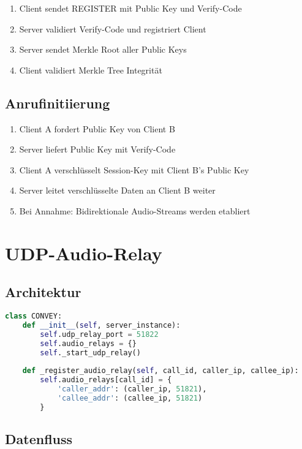 \documentclass[10pt,a4paper]{article}
\begin{document}
\begin{enumerate}
\item Client sendet REGISTER mit Public Key und Verify-Code
\item Server validiert Verify-Code und registriert Client
\item Server sendet Merkle Root aller Public Keys
\item Client validiert Merkle Tree Integrität
\end{enumerate}

\subsection{Anrufinitiierung}

\begin{enumerate}
\item Client A fordert Public Key von Client B
\item Server liefert Public Key mit Verify-Code
\item Client A verschlüsselt Session-Key mit Client B's Public Key
\item Server leitet verschlüsselte Daten an Client B weiter
\item Bei Annahme: Bidirektionale Audio-Streams werden etabliert
\end{enumerate}

\section{UDP-Audio-Relay}

\subsection{Architektur}

\begin{lstlisting}[language=Python,caption=UDP-Relay-Setup]
class CONVEY:
    def __init__(self, server_instance):
        self.udp_relay_port = 51822
        self.audio_relays = {}
        self._start_udp_relay()
    
    def _register_audio_relay(self, call_id, caller_ip, callee_ip):
        self.audio_relays[call_id] = {
            'caller_addr': (caller_ip, 51821),
            'callee_addr': (callee_ip, 51821)
        }
\end{lstlisting}

\subsection{Datenfluss}
\end{document}
